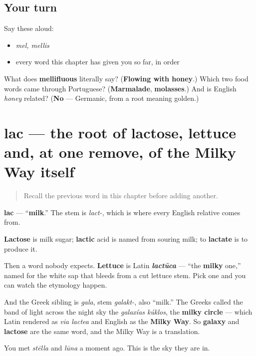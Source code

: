 \subsection*{Your turn}
Say these aloud:

\begin{itemize}
\raggedright
  \item \emph{mel, mellis}
  \item every word this chapter has given you so far, in order
\end{itemize}

\begin{tcolorbox}[breakable,colback=teal!4,colframe=teal!35!black,title={Before you move on}]
What does \textbf{mellifluous} literally say? (\textbf{Flowing with honey}.) Which two food words came through Portuguese? (\textbf{Marmalade}, \textbf{molasses}.) And is English \emph{honey} related? (\textbf{No} — Germanic, from a root meaning golden.)
\end{tcolorbox}
\section[lac, lactis]{lac — the root of lactose, lettuce and, at one remove, of the Milky Way itself}

\label{lesson:LA-C47-lac}



\begin{quote}
Recall the previous word in this chapter before adding another.
\end{quote}

\begin{cousinweb}
\textbf{lac} — \textquotedblleft{}\textbf{milk}.\textquotedblright{} The stem is \emph{lact-}, which is where every English relative comes from.

\textbf{Lactose} is milk sugar; \textbf{lactic} acid is named from souring milk; to \textbf{lactate} is to produce it.

Then a word nobody expects. \textbf{Lettuce} is Latin \emph{\textbf{lactūca}} — \textquotedblleft{}the \textbf{milky} one,\textquotedblright{} named for the white sap that bleeds from a cut lettuce stem. Pick one and you can watch the etymology happen.

And the Greek sibling is \emph{gala}, stem \emph{galakt-}, also \textquotedblleft{}milk.\textquotedblright{} The Greeks called the band of light across the night sky the \emph{galaxías kúklos}, the \textbf{milky circle} — which Latin rendered as \emph{via lactea} and English as the \textbf{Milky Way}. So \textbf{galaxy} and \textbf{lactose} are the same word, and the Milky Way is a translation.

You met \emph{stēlla} and \emph{lūna} a moment ago. This is the sky they are in.
\end{cousinweb}

